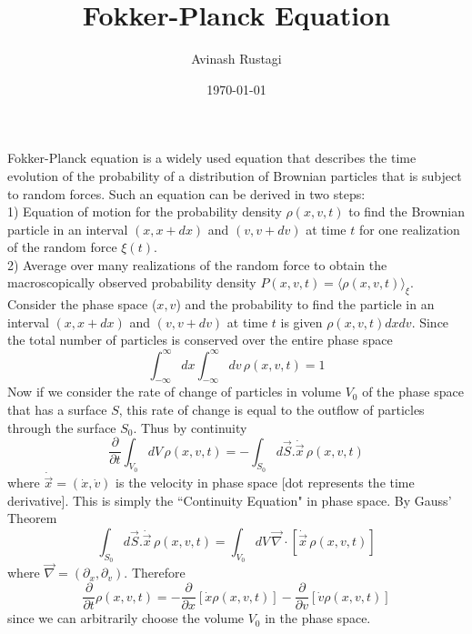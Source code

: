 \documentclass[aps,prb,onecolumn,notitlepage,showpacs,floatfix,superscriptaddress]{revtex4-1}
\begin{document}
\title{Fokker-Planck Equation}

\author{Avinash Rustagi}
%
\date{\today}

\maketitle
%
Fokker-Planck equation is a widely used equation that describes the time evolution of the probability of a distribution of Brownian particles that is subject to random forces. Such an equation can be derived in two steps:\\

1) Equation of motion for the probability density $\rho(x,v,t)$ to find the Brownian particle in an interval $(x,x+dx)$ and $(v,v+dv)$ at time $t$ for one realization of the random force $\xi(t)$. \\

2) Average over many realizations of the random force to obtain the macroscopically observed probability density $P(x,v,t) = \langle \rho(x,v,t) \rangle_\xi$. \\

Consider the phase space ($x,v$) and the probability to find the particle in an interval $(x,x+dx)$ and $(v,v+dv)$ at time $t$ is given $\rho(x,v,t) dx dv$. Since the total number of particles is conserved over the entire phase space
\begin{equation}
\int_{-\infty}^{\infty} dx  \int_{-\infty}^{\infty} dv \, \rho(x,v,t) = 1
\end{equation}
Now if we consider the rate of change of particles in volume $V_0$ of the phase space that has a surface $S$, this rate of change is equal to the outflow of particles through the surface $S_0$. Thus by continuity
\begin{equation}
\dfrac{\partial}{\partial t} \int_{V_0} dV \, \rho(x,v,t) = - \int_{S_0} d\vec{S}.\dot{\vec{x}} \, \rho(x,v,t)
\end{equation} 
where $\dot{\vec{x}} = (\dot{x},\dot{v})$ is the velocity in phase space [dot represents the time derivative]. This is simply the ``Continuity Equation" in phase space. By Gauss' Theorem
\begin{equation}
\int_{S_0} d\vec{S}.\dot{\vec{x}} \, \rho(x,v,t) =  \int_{V_0} dV \, \vec{\nabla} \cdot [\dot{\vec{x}} \, \rho(x,v,t)]
\end{equation} 
where $\vec{\nabla} = (\partial_x, \partial_v)$. Therefore
\begin{equation}
\dfrac{\partial}{\partial t}  \rho(x,v,t) = - \dfrac{\partial}{\partial x} [\dot{x} \rho(x,v,t)] - \dfrac{\partial}{\partial v} [\dot{v} \rho(x,v,t)]
\end{equation}
since we can arbitrarily choose the volume $V_0$ in the phase space. \\
\end{document}
